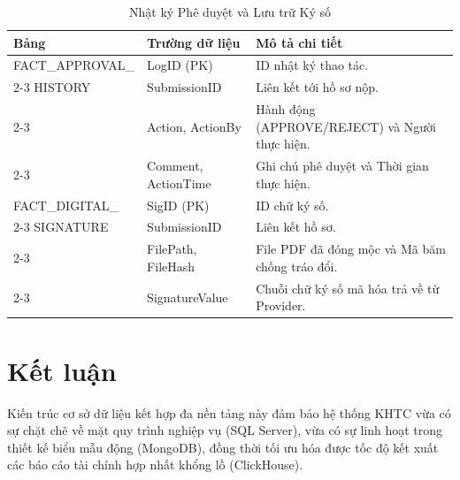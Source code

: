 \documentclass[12pt,a4paper]{article}
\begin{document}
\begin{table}[h!]
    \centering
    \caption{Nhật ký Phê duyệt và Lưu trữ Ký số}
    \begin{tabularx}{\textwidth}{|l|l|X|}
        \hline
        \textbf{Bảng} & \textbf{Trường dữ liệu} & \textbf{Mô tả chi tiết} \\ \hline
        FACT\_APPROVAL\_& LogID (PK) & ID nhật ký thao tác. \\ \cline{2-3}
        HISTORY       & SubmissionID & Liên kết tới hồ sơ nộp. \\ \cline{2-3}
                      & Action, ActionBy & Hành động (APPROVE/REJECT) và Người thực hiện. \\ \cline{2-3}
                      & Comment, ActionTime& Ghi chú phê duyệt và Thời gian thực hiện. \\ \hline
        FACT\_DIGITAL\_ & SigID (PK) & ID chữ ký số. \\ \cline{2-3}
        SIGNATURE     & SubmissionID & Liên kết hồ sơ. \\ \cline{2-3}
                      & FilePath, FileHash & File PDF đã đóng mộc và Mã băm chống tráo đổi. \\ \cline{2-3}
                      & SignatureValue & Chuỗi chữ ký số mã hóa trả về từ Provider. \\ \hline
    \end{tabularx}
\end{table}

\section{Kết luận}
Kiến trúc cơ sở dữ liệu kết hợp đa nền tảng này đảm bảo hệ thống KHTC vừa có sự chặt chẽ về mặt quy trình nghiệp vụ (SQL Server), vừa có sự linh hoạt trong thiết kế biểu mẫu động (MongoDB), đồng thời tối ưu hóa được tốc độ kết xuất các báo cáo tài chính hợp nhất khổng lồ (ClickHouse).
\end{document}
